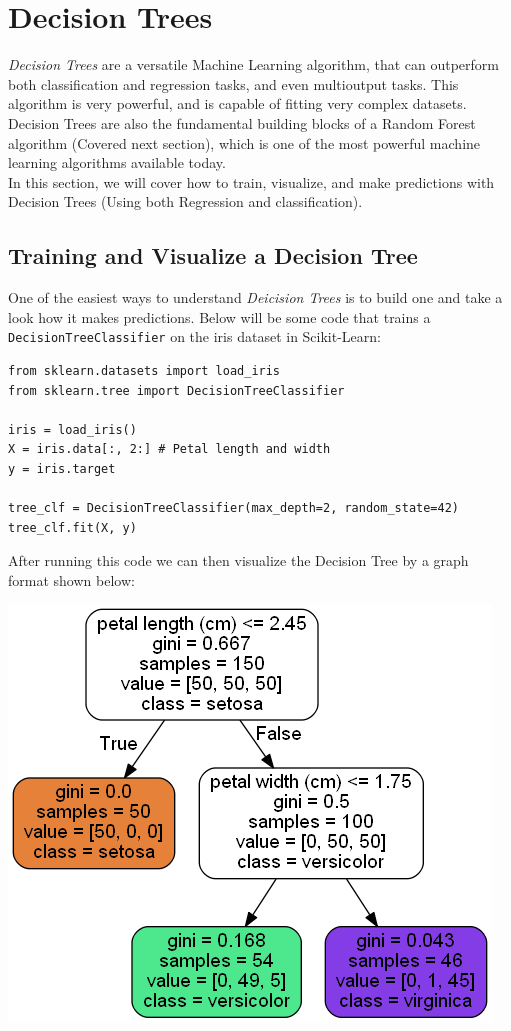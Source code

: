 
\section{Decision Trees}

\textit{Decision Trees} are a versatile Machine Learning algorithm, that can outperform both classification and regression tasks,
and even multioutput tasks. This algorithm is very powerful, and is capable of fitting very complex datasets. Decision Trees
are also the fundamental building blocks of a Random Forest algorithm (Covered next section), which is one of the most 
powerful machine learning algorithms available today. \\

\noindent
In this section, we will cover how to train, visualize, and make predictions with Decision Trees (Using both Regression and 
classification).

\subsection{Training and Visualize a Decision Tree}

One of the easiest ways to understand \textit{Deicision Trees} is to build one and take a look how it makes predictions. Below
will be some code that trains a \texttt{DecisionTreeClassifier} on the iris dataset in Scikit-Learn:

\begin{verbatim}
from sklearn.datasets import load_iris
from sklearn.tree import DecisionTreeClassifier

iris = load_iris()
X = iris.data[:, 2:] # Petal length and width
y = iris.target

tree_clf = DecisionTreeClassifier(max_depth=2, random_state=42)
tree_clf.fit(X, y)    
\end{verbatim}

\noindent
After running this code we can then visualize the Decision Tree by a graph format shown below:

\begin{center}
\includegraphics[scale=0.45]{Images/iris_tree.png}
\end{center}

